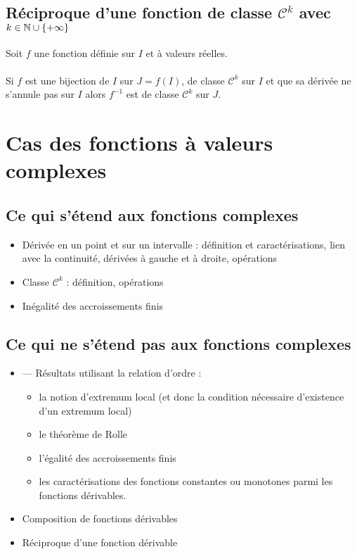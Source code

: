 \subsection{Réciproque d’une fonction de classe \(\mathcal{C}^k\) avec \(k \in \mathbb{N} \cup \left\lbrace+\infty\right\rbrace\)}
\begin{defprop}
    Soit \(f\) une fonction définie sur \(I\) et à valeurs réelles.\\~\\
    Si \(f\) est une bijection de \(I\) sur \(J = f (I)\), de classe \(\mathcal{C}^k\) sur \(I\) et que sa dérivée ne s’annule pas sur \(I\) alors \(f ^{-1}\) est de classe \(\mathcal{C}^k\) sur \(J\).
\end{defprop}

\section{Cas des fonctions à valeurs complexes}
\subsection{Ce qui s’étend aux fonctions complexes}
\begin{defprop}
    \begin{itemize}
        \item Dérivée en un point et sur un intervalle : définition et caractérisations, lien avec la continuité, dérivées à gauche et à droite, opérations
        \item Classe \(\mathcal{C}^k\) : définition, opérations
        \item Inégalité des accroissements finis
    \end{itemize}
\end{defprop}

\subsection{Ce qui ne s’étend pas aux fonctions complexes}

\begin{defprop}
    \begin{itemize}
        \item — Résultats utilisant la relation d’ordre :
        \begin{itemize}
            \item la notion d’extremum local (et donc la condition nécessaire d’existence d’un extremum local) 
            \item le théorème de Rolle 
            \item l’égalité des accroissements finis 
            \item les caractérisations des fonctions constantes ou monotones parmi les fonctions dérivables.
        \end{itemize}
        \item Composition de fonctions dérivables
        \item Réciproque d’une fonction dérivable
    \end{itemize}
\end{defprop}

